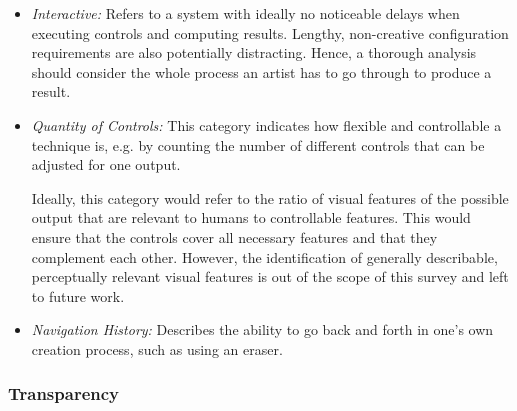 \begin{itemize}
    \item \textit{Interactive:} Refers to a system with ideally no noticeable delays when executing controls and computing results. Lengthy, non-creative configuration requirements are also potentially distracting. Hence, a thorough analysis should consider the whole process an artist has to go through to produce a result.


    \item \textit{Quantity of Controls:} This category indicates how flexible and controllable a technique is, e.g. by counting the number of different controls that can be adjusted for one output. 

    
    Ideally, this category would refer to the ratio of visual features of the possible output that are relevant to humans to controllable features. This would ensure that the controls cover all necessary features and that they complement each other. However, the identification of generally describable, perceptually relevant visual features is out of the scope of this survey and left to future work.

    \item \textit{Navigation History:} Describes the ability to go back and forth in one's own creation process, such as using an eraser.

\end{itemize}




\subsubsection{Transparency}
\label{subsubsec:transparency}

